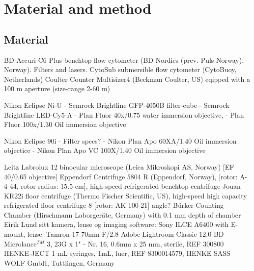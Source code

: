 \chapter{Material and method}
\label{chap:m&m}

\section{Material}
BD Accuri C6 Plus benchtop flow cytometer (BD Nordics (prev. Puls Norway), Norway). Filters and lasers.
CytoSub submersible flow cytometer (CytoBuoy, Netherlands)
Coulter Counter Multisizer4 (Beckman Coulter, US) eqipped with a 100 \micro m aperture (size-range 2-60 \micro m)

Nikon Eclipse Ni-U
- Semrock Brightline GFP-4050B filter-cube
- Semrock Brightline LED-Cy5-A
- Plan Fluor 40x/0.75 water immersion objective,
- Plan Fluor 100x/1.30 Oil immersion objective

Nikon Eclipse 90i
- Filter specs?
- Nikon Plan Apo 60XA/1.40 Oil immersion objectice
- Nikon Plan Apo VC 100X/1.40 Oil immersion objective

Leitz Labrolux 12 binocular microscope (Leica Mikroskopi AS, Norway) [EF 40/0.65 objective]
Eppendorf Centrifuge 5804 R (Eppendorf, Norway), [rotor: A-4-44, rotor radius: 15.5 cm], high-speed refrigerated benchtop centrifuge
Jouan KR22i floor centrifuge (Thermo Fischer Scientific, US), high-speed high capacity refrigerated floor centrifuge 8 [rotor: AK 100-21] angle?
Bürker Counting Chamber (Hirschmann Laborgeräte, Germany) with 0.1 mm depth of chamber
Eirik Lund sitt kamera, lense og imaging software: 
Sony ILCE A6400 with E-mount, lense: Tamron 17-70mm F/2.8 
Adobe\textsuperscript{\textregistered} Lightroom Classic 12.0 
BD Microlance$^{TM}$ 3, 23G x 1" - Nr. 16, 0.6mm x 25 mm, sterile, REF 300800
HENKE-JECT 1 mL syringes, 1mL, luer, REF 8300014579, HENKE SASS WOLF GmbH, Tuttlingen, Germany

